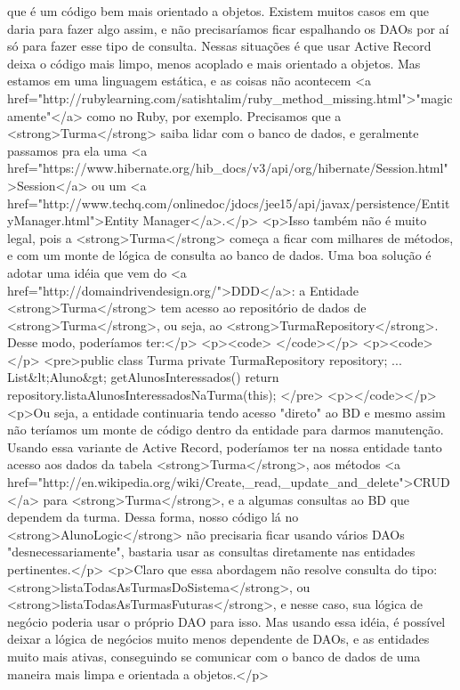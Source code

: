 que é um código bem mais orientado a objetos.
Existem muitos casos em que daria para fazer algo assim, e não precisaríamos ficar espalhando os DAOs por aí só para fazer esse tipo de consulta. Nessas situações é que usar Active Record deixa o código mais limpo, menos acoplado e mais orientado a objetos. Mas estamos em uma linguagem estática, e as coisas não acontecem <a href="http://rubylearning.com/satishtalim/ruby_method_missing.html">"magicamente"</a> como no Ruby, por exemplo. Precisamos que a <strong>Turma</strong> saiba lidar com o banco de dados, e geralmente passamos pra ela uma <a href="https://www.hibernate.org/hib_docs/v3/api/org/hibernate/Session.html">Session</a> ou um <a href="http://www.techq.com/onlinedoc/jdocs/jee15/api/javax/persistence/EntityManager.html">Entity Manager</a>.</p>
<p>Isso também não é muito legal, pois a <strong>Turma</strong> começa a ficar com milhares de métodos, e com um monte de lógica de consulta ao banco de dados. Uma boa solução é adotar uma idéia que vem do <a href="http://domaindrivendesign.org/">DDD</a>: a Entidade <strong>Turma</strong> tem acesso ao repositório de dados de <strong>Turma</strong>, ou seja, ao <strong>TurmaRepository</strong>. Desse modo, poderíamos ter:</p>
<p><code> </code></p>
<p><code></p>
<pre>public class Turma {
   private TurmaRepository repository;
   ...
   List&lt;Aluno&gt; getAlunosInteressados() {
       return repository.listaAlunosInteressadosNaTurma(this);
   }
}</pre>
<p></code></p>
<p>Ou seja, a entidade continuaria tendo acesso "direto" ao BD e mesmo assim não teríamos um monte de código dentro da entidade para darmos manutenção. Usando essa variante de Active Record, poderíamos ter na nossa entidade tanto acesso aos dados da tabela <strong>Turma</strong>, aos métodos <a href="http://en.wikipedia.org/wiki/Create,_read,_update_and_delete">CRUD</a> para <strong>Turma</strong>, e a algumas consultas ao BD que dependem da turma. Dessa forma, nosso código lá no <strong>AlunoLogic</strong> não precisaria ficar usando vários DAOs "desnecessariamente", bastaria usar as consultas diretamente nas entidades pertinentes.</p>
<p>Claro que essa abordagem não resolve consulta do tipo: <strong>listaTodasAsTurmasDoSistema</strong>, ou <strong>listaTodasAsTurmasFuturas</strong>, e nesse caso, sua lógica de negócio poderia usar o próprio DAO para isso. Mas usando essa idéia, é possível deixar a lógica de negócios muito menos dependente de DAOs, e as entidades muito mais ativas, conseguindo se comunicar com o banco de dados de uma maneira mais limpa e orientada a objetos.</p>



